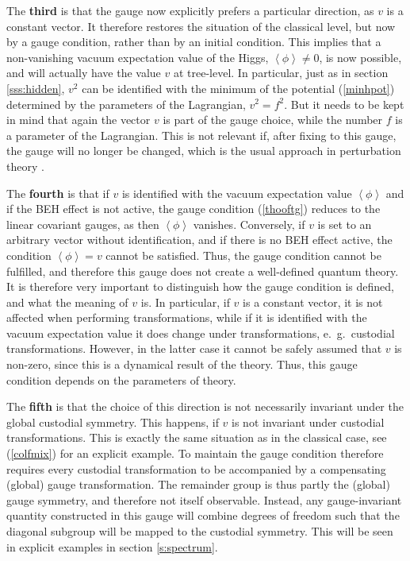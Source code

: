 \documentclass[final,twoside,12pt]{article}
\newcommand*{\pref}[1]{(\ref{#1})}
\newcommand*{\1}{1\!\!\!\bot}
\newcommand*{\la}{\left\langle}
\newcommand*{\ra}{\right\rangle}
\begin{document}
The {\bf third} is that the gauge now explicitly prefers a particular direction, as $v$ is a constant vector. It therefore restores the situation of the classical level, but now by a gauge condition, rather than by an initial condition. This implies that a non-vanishing vacuum expectation value of the Higgs, $\la \phi\ra\neq 0$, is now possible, and will actually have the value $v$ at tree-level. In particular, just as in section \ref{sss:hidden}, $v^2$ can be identified with the minimum of the potential \pref{minhpot} determined by the parameters of the Lagrangian, $v^2=f^2$. But it needs to be kept in mind that again the vector $v$ is part of the gauge choice, while the number $f$ is a parameter of the Lagrangian. This is not relevant if, after fixing to this gauge, the gauge will no longer be changed, which is the usual approach in perturbation theory \cite{Bohm:2001yx}.

The {\bf fourth} is that if $v$ is identified with the vacuum expectation value $\la\phi\ra$ and if the BEH effect is not active, the gauge condition \pref{thooftg} reduces to the linear covariant gauges, as then $\la\phi\ra$ vanishes. Conversely, if $v$ is set to an arbitrary vector without identification, and if there is no BEH effect active, the condition $\la\phi\ra=v$ cannot be satisfied. Thus, the gauge condition cannot be fulfilled, and therefore this gauge does not create a well-defined quantum theory. It is therefore very important to distinguish how the gauge condition is defined, and what the meaning of $v$ is. In particular, if $v$ is a constant vector, it is not affected when performing transformations, while if it is identified with the vacuum expectation value it does change under transformations, e.\ g.\ custodial transformations. However, in the latter case it cannot be safely assumed that $v$ is non-zero, since this is a dynamical result of the theory. Thus, this gauge condition depends on the parameters of theory.

The {\bf fifth} is that the choice of this direction is not necessarily invariant under the global custodial symmetry. This happens, if $v$ is not invariant under custodial transformations. This is exactly the same situation as in the classical case, see \pref{colfmix} for an explicit example. To maintain the gauge condition therefore requires every custodial transformation to be accompanied by a compensating (global) gauge transformation. The remainder group is thus partly the (global) gauge symmetry, and therefore not itself observable. Instead, any gauge-invariant quantity constructed in this gauge will combine degrees of freedom such that the diagonal subgroup will be mapped to the custodial symmetry. This will be seen in explicit examples in section \ref{s:spectrum}.
\end{document}
